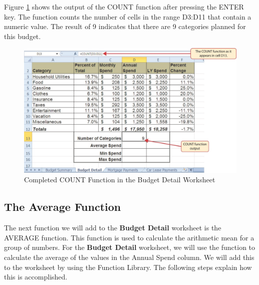 Figure \ref{02:fig18} shows the output of the COUNT function after pressing the ENTER key. The function counts the number of cells in the range \textsf{D3:D11} that contain a numeric value. The result of 9 indicates that there are 9 categories planned for this budget.

\begin{figure}[H]
	\centering
	\includegraphics[width=\maxwidth{.95\linewidth}]{gfx/ch02_fig18}
	\caption{Completed COUNT Function in the Budget Detail Worksheet}
	\label{02:fig18}
\end{figure}

\subsection{The Average Function}

The next function we will add to the \textbf{Budget Detail} worksheet is the AVERAGE function. This function is used to calculate the arithmetic mean for a group of numbers. For the \textbf{Budget Detail} worksheet, we will use the function to calculate the average of the values in the Annual Spend column. We will add this to the worksheet by using the Function Library. The following steps explain how this is accomplished.

